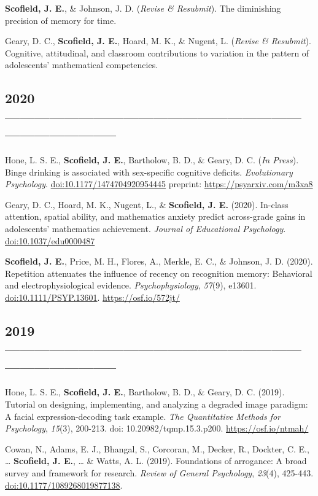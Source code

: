 \documentclass[11pt, a4paper]{awesome-cv}
\begin{document}
\textbf{Scofield, J. E.}, \& Johnson, J. D. (\emph{Revise \& Resubmit}). The diminishing precision of memory for time.

Geary, D. C., \textbf{Scofield, J. E.}, Hoard, M. K., \& Nugent, L. (\emph{Revise \& Resubmit}). Cognitive, attitudinal, and classroom contributions to variation in the pattern of adolescents' mathematical competencies.

\hypertarget{section}{%
\subsection{2020 -----------------------------------------------------------------------------------}\label{section}}

Hone, L. S. E., \textbf{Scofield, J. E.}, Bartholow, B. D., \& Geary, D. C. (\emph{In Press}). Binge drinking is associated with sex-specific cognitive deficits. \emph{Evolutionary Psychology}. \url{doi:10.1177/1474704920954445} preprint: \url{https://psyarxiv.com/m3xa8}

Geary, D. C., Hoard, M. K., Nugent, L., \& \textbf{Scofield, J. E.} (2020). In-class attention, spatial ability, and mathematics anxiety predict across-grade gains in adolescents' mathematics achievement. \emph{Journal of Educational Psychology}. \url{doi:10.1037/edu0000487}

\textbf{Scofield, J. E.}, Price, M. H., Flores, A., Merkle, E. C., \& Johnson, J. D. (2020). Repetition attenuates the influence of recency on recognition memory: Behavioral and electrophysiological evidence. \emph{Psychophysiology}, \emph{57}(9), e13601. \url{doi:10.1111/PSYP.13601}. \url{https://osf.io/572jt/}

\hypertarget{section-1}{%
\subsection{2019 -----------------------------------------------------------------------------------}\label{section-1}}

Hone, L. S. E., \textbf{Scofield, J. E.}, Bartholow, B. D., \& Geary, D. C. (2019). Tutorial on designing, implementing, and analyzing a degraded image paradigm: A facial expression-decoding task example. \emph{The Quantitative Methods for Psychology}, \emph{15}(3), 200-213. doi: 10.20982/tqmp.15.3.p200. \url{https://osf.io/ntmah/}

Cowan, N., Adams, E. J., Bhangal, S., Corcoran, M., Decker, R., Dockter, C. E., \ldots{} \textbf{Scofield, J. E.}, \ldots{} \& Watts, A. L. (2019). Foundations of arrogance: A broad survey and framework for research. \emph{Review of General Psychology}, \emph{23}(4), 425-443. \url{doi:10.1177/1089268019877138}.
\end{document}
